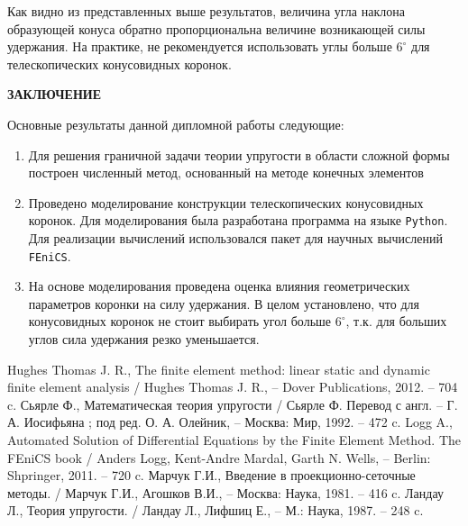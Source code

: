 \documentclass[a4paper, 14pt]{extreport}
\begin{document}
Как видно из представленных выше результатов, величина 
угла наклона образующей конуса обратно пропорциональна величине возникающей силы удержания. На практике, не 
рекомендуется использовать углы больше $6^{\circ}$ для 
телескопических конусовидных коронок.

\newpage
{}
\begin{center}
	\Large{\textbf{ЗАКЛЮЧЕНИЕ}}
\end{center}

Основные результаты данной дипломной работы следующие:
\begin{enumerate}
\item  Для решения граничной задачи теории упругости в 
области сложной формы построен численный метод,
основанный на методе конечных элементов

\item Проведено моделирование конструкции телескопических 
конусовидных коронок. Для моделирования была разработана
программа на языке \texttt{Python}. Для реализации 
вычислений использовался пакет для научных вычислений
\texttt{FEniCS}.

\item На основе моделирования проведена оценка влияния 
геометрических параметров коронки на силу удержания.
В целом установлено, что для конусовидных коронок не 
стоит выбирать угол больше $6^{\circ}$, т.к. для больших углов 
сила удержания резко уменьшается.

\end{enumerate}


\newpage
{}
\renewcommand{\bibname}{\Large{СПИСОК ИСПОЛЬЗОВАННЫХ ИСТОЧНИКОВ}}
\begin{thebibliography}{9}

			Hughes Thomas J. R.,
			{The finite element method: linear static and dynamic finite element analysis} /
			Hughes Thomas J. R., -- Dover Publications, 2012. -- 704 c.
			Сьярле Ф.,
			{Математическая теория упругости} /
			Сьярле Ф. Перевод с англ. -- Г. А. Иосифьяна ; под ред. О. А. Олейник, -- Москва: Мир, 1992. -- 472 c.
			Logg A.,
			{Automated Solution of Differential Equations by the Finite Element Method. The FEniCS book} /
			Anders Logg, Kent-Andre Mardal, Garth N. Wells, -- Berlin: Shpringer, 2011. -- 720 c.
			Марчук Г.И.,
			{Введение в проекционно-сеточные методы.} /
			Марчук Г.И., Агошков В.И., -- Москва: Наука, 1981. -- 416
			 c.
			 Ландау Л.,
			{Теория упругости.} /
			Ландау Л., Лифшиц Е., -- М.: Наука, 1987. -- 248 c.
\end{thebibliography}
\end{document}
